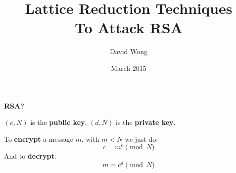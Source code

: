 \documentclass{beamer}
\title{Lattice Reduction Techniques\\To Attack RSA}
\author{David Wong}
\institute{University of Bordeaux}
\date{March 2015}
\begin{document}
\fontsize{16pt}{15.2}\selectfont
{} 
\begin{frame}
\titlepage
\end{frame}

\fontsize{90pt}{15.2}\selectfont
{}
\begin{frame}
\begin{center}
\textbf{RSA?}
\end{center}
\end{frame}

\fontsize{14pt}{15.2}\selectfont
\usebackgroundtemplate{}
\begin{frame}
$(e, N)$ is the \textbf{public key}, 
$(d, N)$ is the \textbf{private key}.\\

\pause

\vspace{1cm} To \textbf{encrypt} a message $m$, with $m < N$ we just do:
\[ c = m^e \pmod{N} \]
\pause
And to \textbf{decrypt}:
\[ m = c^d \pmod{N} \]
\end{frame}
\end{document}
